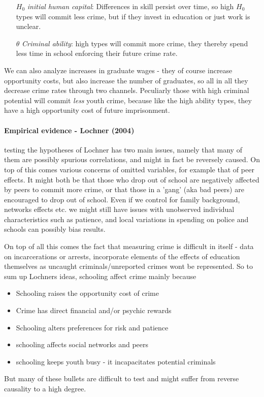 \documentclass[12pt, a4paper]{article}
\begin{document}
\begin{multicols}{2}
\begin{itemize}
\item[$H_0$] \textit{initial human capital}: Differences in skill persist over time, so high $H_0$ types will commit less crime, but if they invest in education or just work is unclear.
\item[$\theta$] \textit{Criminal ability}: high types will commit more crime, they thereby spend less time in school enforcing their future crime rate.
\end{itemize}
We can also analyze increases in graduate wages - they of course increase opportunity costs, but also increase the number of graduates, so all in all they decrease crime rates through two channels. Peculiarly those with high criminal potential will commit \textit{less} youth crime, because like the high ability types, they have a high opportunity cost of future imprisonment.

\paragraph{Empirical evidence - Lochner (2004)} testing the hypotheses of Lochner has two main issues, namely that many of them are possibly spurious correlations, and might in fact be reversely caused. On top of this comes various concerns of omitted variables, for example that of peer effects. It might both be that those who drop out of school are negatively affected by peers to commit more crime, or that those in a 'gang' (aka bad peers) are encouraged to drop out of school. Even if we control for family background, networks effects etc. we might still have issues with unobserved individual characteristics such as patience, and local variations in spending on police and schools can possibly bias results.

On top of all this comes the fact that measuring crime is difficult in itself - data on incarcerations or arrests, incorporate elements of the effects of education themselves as uncaught criminals/unreported crimes wont be represented. So to sum up Lochners ideas, schooling affect crime mainly because
\begin{itemize}
\item Schooling raises the opportunity cost of crime
\item Crime has direct financial and/or psychic rewards
\item Schooling alters preferences for risk and patience
\item schooling affects social networks and peers
\item schooling keeps youth busy - it incapacitates potential criminals
\end{itemize}
But many of these bullets are difficult to test and might suffer from reverse causality to a high degree.


\end{multicols}
\end{document}
